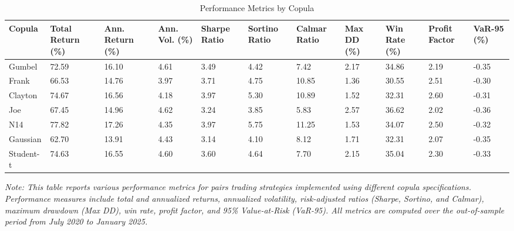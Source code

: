 \begin{table}[H]
\centering
\caption{Performance Metrics by Copula}
\label{tab:copula_performance}
\small\begin{tabular}{lR{1.2cm}R{1.2cm}R{1.1cm}R{1.3cm}R{1.3cm}R{1.3cm}R{1.2cm}R{1.2cm}R{1.2cm}R{1.3cm}}
\toprule
Copula & Total Return (\%) & Ann. Return (\%) & Ann. Vol. (\%) & Sharpe Ratio & Sortino Ratio & Calmar Ratio & Max DD (\%) & Win Rate (\%) & Profit Factor & VaR-95 (\%) \\
\midrule
Gumbel & 72.59 & 16.10 & 4.61 & 3.49 & 4.42 & 7.42 & 2.17 & 34.86 & 2.19 & -0.35 \\
Frank & 66.53 & 14.76 & 3.97 & 3.71 & 4.75 & 10.85 & 1.36 & 30.55 & 2.51 & -0.30 \\
Clayton & 74.67 & 16.56 & 4.18 & 3.97 & 5.30 & 10.89 & 1.52 & 32.31 & 2.60 & -0.31 \\
Joe & 67.45 & 14.96 & 4.62 & 3.24 & 3.85 & 5.83 & 2.57 & 36.62 & 2.02 & -0.36 \\
N14 & 77.82 & 17.26 & 4.35 & 3.97 & 5.75 & 11.25 & 1.53 & 34.07 & 2.50 & -0.32 \\
Gaussian & 62.70 & 13.91 & 4.43 & 3.14 & 4.10 & 8.12 & 1.71 & 32.31 & 2.07 & -0.35 \\
Student-t & 74.63 & 16.55 & 4.60 & 3.60 & 4.64 & 7.70 & 2.15 & 35.04 & 2.30 & -0.33 \\
\bottomrule
\end{tabular}

\vspace{0.5cm}
\begin{minipage}{\textwidth}
\setlength{\parindent}{0pt}
\small\textit{Note: 
This table reports various performance metrics for pairs trading strategies implemented using different copula specifications. Performance measures include total and annualized returns, annualized volatility, risk-adjusted ratios (Sharpe, Sortino, and Calmar), maximum drawdown (Max DD), win rate, profit factor, and 95\% Value-at-Risk (VaR-95). All metrics are computed over the out-of-sample period from July 2020 to January 2025.
}
\end{minipage}

\end{table}


